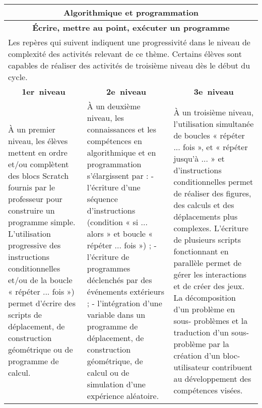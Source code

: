\documentclass[11pt]{article}
\newcommand{\categorie}[1]{\hline\multicolumn{3}{|c|}{\color{white}\LARGE\cellcolor{bleu}\sffamily\phantom{É} #1 \phantom{É}}\rmfamily \\\hline}
\newcommand{\souscategorie}[1]{\hline\multicolumn{3}{|c|}{\color{bleu}\Large\bf\rmfamily\phantom{É}#1\phantom{É}\rmfamily}\\\hline}
\newcommand{\note}[1]{\hline\multicolumn{3}{|p{18.6cm}|}{#1} \\ \hline}
\newcommand{\niveau}[1]{\multicolumn{1}{|c|}{\textbf{#1~niveau}}}
\newenvironment{programme}
{
    \setlength{\arrayrulewidth}{0.5pt}
    \arrayrulecolor{bleu}
    \begin{center}
    \begin{tabular}{|p{6.4cm}|p{6.4cm}|p{6.4cm}|}
}
{
    \hline
    \end{tabular}
    \end{center}
}
\begin{document}
\begin{programme}
    \categorie{Algorithmique et programmation} 
    \souscategorie{Écrire, mettre au point, exécuter un programme}
    \note{Les repères qui suivent indiquent une progressivité dans le niveau de complexité des activités relevant de ce thème. Certains élèves sont capables de réaliser des activités de troisième niveau dès le début du cycle.}
    \niveau{1er} & \niveau{2e} & \niveau{3e} \\ \hline
    À un premier niveau, les élèves mettent en ordre et/ou complètent des blocs Scratch fournis par le professeur pour construire un programme simple. L’utilisation progressive des instructions conditionnelles et/ou de la boucle « répéter ... fois ») permet d’écrire des scripts de déplacement, de construction géométrique ou de programme de calcul. & À un deuxième niveau, les connaissances et les compétences en algorithmique et en programmation s’élargissent par : - l’écriture d’une séquence d’instructions (condition « si ... alors » et boucle « répéter ... fois ») ; - l’écriture de programmes déclenchés par des événements extérieurs ; - l’intégration d’une variable dans un programme de déplacement, de construction géométrique, de calcul ou de simulation d’une expérience aléatoire. & À un troisième niveau, l’utilisation simultanée de boucles « répéter ... fois », et « répéter jusqu’à ... » et d’instructions conditionnelles permet de réaliser des figures, des calculs et des déplacements plus complexes. L’écriture de plusieurs scripts fonctionnant en parallèle permet de gérer les interactions et de créer des jeux. La décomposition d’un problème en sous- problèmes et la traduction d’un sous-problème par la création d’un bloc-utilisateur contribuent au développement des compétences visées. \\
\end{programme}
\end{document}
